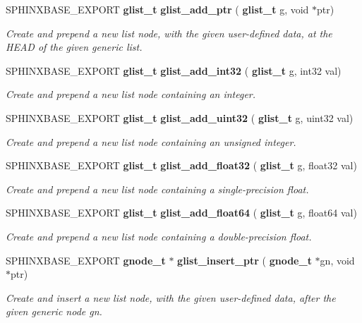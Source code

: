 \begin{DoxyCompactItemize}
\item 
S\+P\+H\+I\+N\+X\+B\+A\+S\+E\+\_\+\+E\+X\+P\+O\+RT \textbf{ glist\+\_\+t} \textbf{ glist\+\_\+add\+\_\+ptr} (\textbf{ glist\+\_\+t} g, void $\ast$ptr)
\begin{DoxyCompactList}\small\item\em Create and prepend a new list node, with the given user-\/defined data, at the H\+E\+AD of the given generic list. \end{DoxyCompactList}\item 
S\+P\+H\+I\+N\+X\+B\+A\+S\+E\+\_\+\+E\+X\+P\+O\+RT \textbf{ glist\+\_\+t} \textbf{ glist\+\_\+add\+\_\+int32} (\textbf{ glist\+\_\+t} g, int32 val)
\begin{DoxyCompactList}\small\item\em Create and prepend a new list node containing an integer. \end{DoxyCompactList}\item 
S\+P\+H\+I\+N\+X\+B\+A\+S\+E\+\_\+\+E\+X\+P\+O\+RT \textbf{ glist\+\_\+t} \textbf{ glist\+\_\+add\+\_\+uint32} (\textbf{ glist\+\_\+t} g, uint32 val)
\begin{DoxyCompactList}\small\item\em Create and prepend a new list node containing an unsigned integer. \end{DoxyCompactList}\item 
S\+P\+H\+I\+N\+X\+B\+A\+S\+E\+\_\+\+E\+X\+P\+O\+RT \textbf{ glist\+\_\+t} \textbf{ glist\+\_\+add\+\_\+float32} (\textbf{ glist\+\_\+t} g, float32 val)
\begin{DoxyCompactList}\small\item\em Create and prepend a new list node containing a single-\/precision float. \end{DoxyCompactList}\item 
S\+P\+H\+I\+N\+X\+B\+A\+S\+E\+\_\+\+E\+X\+P\+O\+RT \textbf{ glist\+\_\+t} \textbf{ glist\+\_\+add\+\_\+float64} (\textbf{ glist\+\_\+t} g, float64 val)
\begin{DoxyCompactList}\small\item\em Create and prepend a new list node containing a double-\/precision float. \end{DoxyCompactList}\item 
S\+P\+H\+I\+N\+X\+B\+A\+S\+E\+\_\+\+E\+X\+P\+O\+RT \textbf{ gnode\+\_\+t} $\ast$ \textbf{ glist\+\_\+insert\+\_\+ptr} (\textbf{ gnode\+\_\+t} $\ast$gn, void $\ast$ptr)
\begin{DoxyCompactList}\small\item\em Create and insert a new list node, with the given user-\/defined data, after the given generic node gn. \end{DoxyCompactList}\item 

\end{DoxyCompactItemize}
